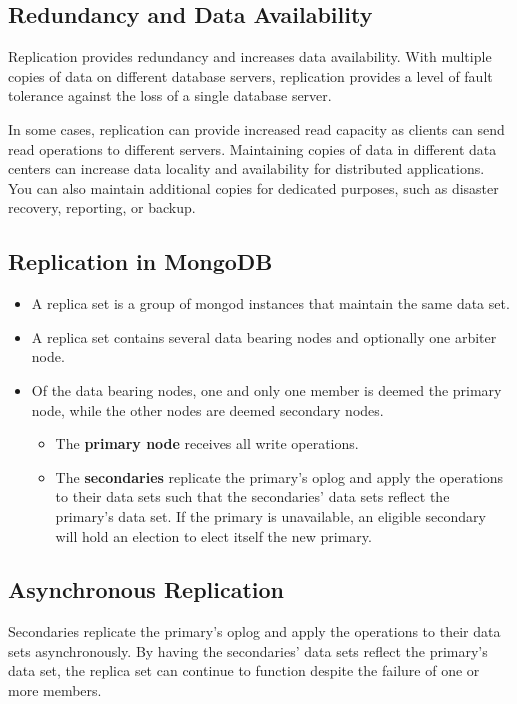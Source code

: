 \subsection{Redundancy and Data Availability}
Replication provides redundancy and increases data availability. With multiple copies of data on different database servers, replication provides a level of fault tolerance against the loss of a single database server.

In some cases, replication can provide increased read capacity as clients can send read operations to different servers. Maintaining copies of data in different data centers can increase data locality and availability for distributed applications. You can also maintain additional copies for dedicated purposes, such as disaster recovery, reporting, or backup.

\subsection{Replication in MongoDB}
\begin{itemize}
    \item A replica set is a group of mongod instances that maintain the same data set.
    \item  A replica set contains several data bearing nodes and optionally one arbiter node.
    \item Of the data bearing nodes, one and only one member is deemed the primary node, while the other nodes are deemed secondary nodes.
    \begin{itemize}
        \item The \textbf{primary node} receives all write operations.
        \item The \textbf{secondaries} replicate the primary's oplog and apply the operations to their data sets such that the secondaries' data sets reflect the primary's data set. If the primary is unavailable, an eligible secondary will hold an election to elect itself the new primary. 
    \end{itemize}
\end{itemize}

\subsection{Asynchronous Replication}
Secondaries replicate the primary's oplog and apply the operations to their data sets asynchronously. By having the secondaries' data sets reflect the primary's data set, the replica set can continue to function despite the failure of one or more members.

